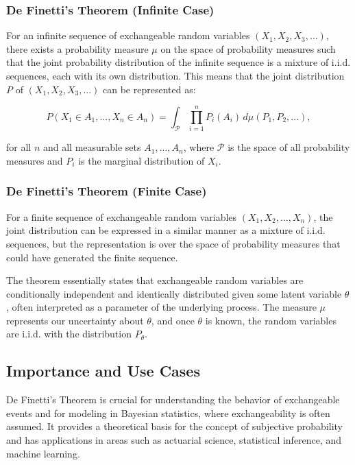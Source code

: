 \documentclass{article}
\begin{document}
\subsubsection{De Finetti's Theorem (Infinite Case)}

For an infinite sequence of exchangeable random variables \( (X_1, X_2, X_3, ...) \), there exists a probability measure \( \mu \) on the space of probability measures such that the joint probability distribution of the infinite sequence is a mixture of i.i.d. sequences, each with its own distribution. This means that the joint distribution \( P \) of \( (X_1, X_2, X_3, ...) \) can be represented as:

\[ P(X_1 \in A_1, ..., X_n \in A_n) = \int_{\mathcal{P}} \prod_{i=1}^n P_i(A_i) \, d\mu(P_1, P_2, ...), \]

for all \( n \) and all measurable sets \( A_1, ..., A_n \), where \( \mathcal{P} \) is the space of all probability measures and \( P_i \) is the marginal distribution of \( X_i \).

\subsubsection{De Finetti's Theorem (Finite Case)}

For a finite sequence of exchangeable random variables \( (X_1, X_2, ..., X_n) \), the joint distribution can be expressed in a similar manner as a mixture of i.i.d. sequences, but the representation is over the space of probability measures that could have generated the finite sequence.

The theorem essentially states that exchangeable random variables are conditionally independent and identically distributed given some latent variable \( \theta \), often interpreted as a parameter of the underlying process. The measure \( \mu \) represents our uncertainty about \( \theta \), and once \( \theta \) is known, the random variables are i.i.d. with the distribution \( P_{\theta} \).


\subsection{Importance and Use Cases}
De Finetti's Theorem is crucial for understanding the behavior of exchangeable events and for modeling in Bayesian statistics, where exchangeability is often assumed. It provides a theoretical basis for the concept of subjective probability and has applications in areas such as actuarial science, statistical inference, and machine learning.
\end{document}
